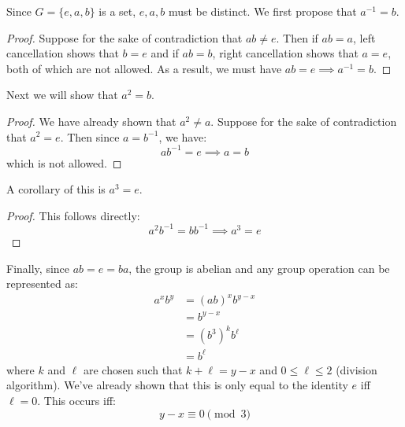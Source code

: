 \begin{sol}
    Since $G=\{e,a,b\}$ is a set, $e,a,b$ must be distinct. We first propose that $a^{-1}=b$.
    \begin{proof}
        Suppose for the sake of contradiction that $ab \neq e$. Then if $ab=a$, left cancellation shows that $b=e$ and if $ab=b$, right cancellation shows that $a=e$, both of which are not allowed. As a result, we must have $ab=e \implies a^{-1}=b$.
    \end{proof}
    Next we will show that $a^2 = b$.
    \begin{proof}
        We have already shown that $a^2 \neq a$. Suppose for the sake of contradiction that $a^2 = e$. Then since $a = b^{-1}$, we have:
        \begin{equation}
            ab^{-1} = e \implies a=b
        \end{equation}
        which is not allowed.
    \end{proof}
    A corollary of this is $a^3=e$.
    \begin{proof}
        This follows directly:
        \begin{equation}
            a^2b^{-1} = bb^{-1} \implies a^3=e
        \end{equation}
    \end{proof}
    Finally, since $ab=e=ba$, the group is abelian and any group operation can be represented as:
    \begin{align}
        a^xb^y &= (ab)^{x}b^{y-x} \\ 
        &= b^{y-x} \\ 
        &= (b^3)^kb^{\ell} \\ 
        &= b^\ell 
    \end{align}
    where $k$ and $\ell$ are chosen such that $k+\ell = y-x$ and $0 \le \ell \le 2$ (division algorithm). We've already shown that this is only equal to the identity $e$ iff $\ell=0$. This occurs iff:
    \begin{equation}
        y-x \equiv 0 \pmod{3}
    \end{equation}
\end{sol}